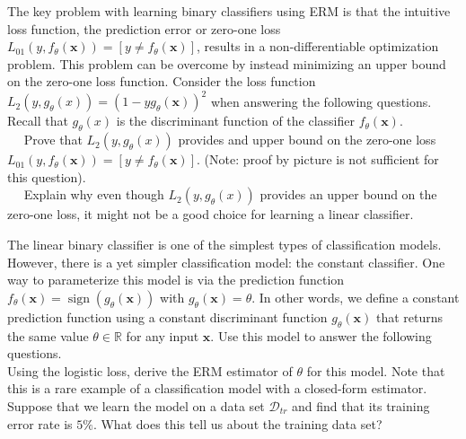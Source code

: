 \documentclass[11pt]{article}
\newcommand{\mbf}[1]{{\mathbf{#1}}}
\DeclareMathOperator*{\sign}{sign}
\begin{document}
\begin{problem}{10} The key problem with learning binary classifiers using ERM is that the intuitive loss function, the prediction error or zero-one loss $L_{01}(y,f_{\theta}(\mbf{x}))=[y\neq f_{\theta}(\mbf{x})]$, results in a non-differentiable optimization problem. This problem can be overcome by instead minimizing an upper bound on the zero-one loss function. Consider the loss function $L_2(y,g_{\theta}(x))=(1-yg_{\theta}(\mbf{x}))^2$ when answering the following questions. Recall that $g_{\theta}(x)$ is the discriminant function of the classifier $f_{\theta}(\mbf{x})$.  \\

~~ Prove that $L_2(y,g_{\theta}(x))$ provides and upper bound on the zero-one loss $L_{01}(y,f_{\theta}(\mbf{x}))=[y\neq f_{\theta}(\mbf{x})]$. (Note: proof by picture is not sufficient for this question).\\

~~ Explain why even though $L_2(y,g_{\theta}(x))$ provides an upper bound on the zero-one loss, it might not be a good choice for learning a linear classifier.

\end{problem}

\begin{problem}{10} The linear binary classifier is one of the simplest types of classification models. However, there is a yet simpler classification model: the constant classifier. One way to parameterize this model is via the prediction function $f_{\theta}(\mbf{x}) = \sign(g_{\theta}(\mbf{x}))$ with $g_{\theta}(\mbf{x}) = \theta$. In other words, we define a constant prediction function  using a constant discriminant function $g_{\theta}(\mbf{x})$ that returns the same value $\theta\in\mathbb{R}$ for any input $\mbf{x}$. Use this model to answer the following questions.\\

 Using the logistic loss, derive the ERM estimator of $\theta$ for this model. Note that this is a rare example of a classification model with a closed-form estimator.\\

 Suppose that we learn the model on a data set $\mathcal{D}_{tr}$ and find that its training error rate is $5\%$. What does this tell us about the training data set?

\end{problem}
\end{document}
